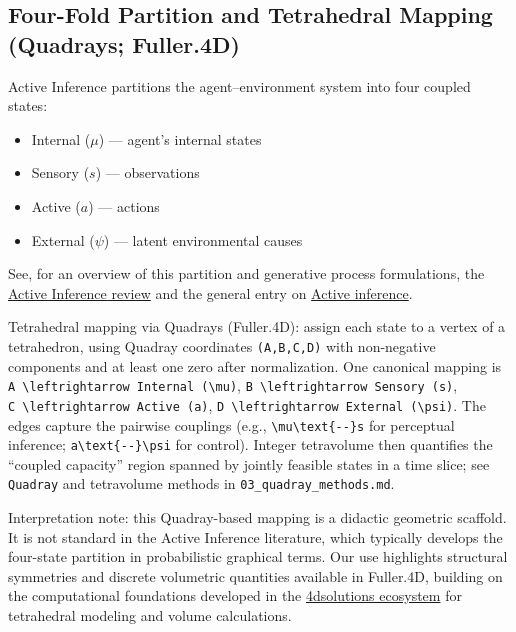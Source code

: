 \documentclass[
  10pt,
]{article}
\providecommand{\tightlist}{%
  \setlength{\itemsep}{0pt}\setlength{\parskip}{0pt}}
\begin{document}
\hypertarget{four-fold-partition-and-tetrahedral-mapping-quadrays-fuller.4d}{%
\subsection{Four-Fold Partition and Tetrahedral Mapping (Quadrays;
Fuller.4D)}\label{four-fold-partition-and-tetrahedral-mapping-quadrays-fuller.4d}}

Active Inference partitions the agent--environment system into four
coupled states:

\begin{itemize}
\tightlist
\item
  Internal (\(\mu\)) --- agent's internal states
\item
  Sensory (\(s\)) --- observations
\item
  Active (\(a\)) --- actions
\item
  External (\(\psi\)) --- latent environmental causes
\end{itemize}

See, for an overview of this partition and generative process
formulations, the
\href{https://discovery.ucl.ac.uk/id/eprint/10176959/1/1-s2.0-S1571064523001094-main.pdf}{Active
Inference review} and the general entry on
\href{https://en.wikipedia.org/wiki/Active_inference}{Active inference}.

Tetrahedral mapping via Quadrays (Fuller.4D): assign each state to a
vertex of a tetrahedron, using Quadray coordinates \texttt{(A,B,C,D)}
with non-negative components and at least one zero after normalization.
One canonical mapping is
\texttt{A\ \textbackslash{}leftrightarrow\ Internal\ (\textbackslash{}mu)},
\texttt{B\ \textbackslash{}leftrightarrow\ Sensory\ (s)},
\texttt{C\ \textbackslash{}leftrightarrow\ Active\ (a)},
\texttt{D\ \textbackslash{}leftrightarrow\ External\ (\textbackslash{}psi)}.
The edges capture the pairwise couplings (e.g.,
\texttt{\textbackslash{}mu\textbackslash{}text\{-\/-\}s} for perceptual
inference; \texttt{a\textbackslash{}text\{-\/-\}\textbackslash{}psi} for
control). Integer tetravolume then quantifies the ``coupled capacity''
region spanned by jointly feasible states in a time slice; see
\texttt{Quadray} and tetravolume methods in
\texttt{03\_quadray\_methods.md}.

Interpretation note: this Quadray-based mapping is a didactic geometric
scaffold. It is not standard in the Active Inference literature, which
typically develops the four-state partition in probabilistic graphical
terms. Our use highlights structural symmetries and discrete volumetric
quantities available in Fuller.4D, building on the computational
foundations developed in the
\href{https://github.com/4dsolutions}{4dsolutions ecosystem} for
tetrahedral modeling and volume calculations.
\end{document}
